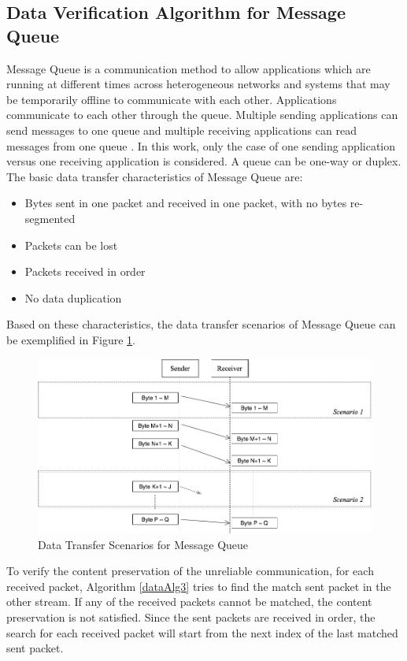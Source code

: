 \subsection{Data Verification Algorithm for Message Queue}
Message Queue is a communication method to allow applications which are running at different times across heterogeneous networks and systems that may be temporarily offline to communicate with each other. Applications communicate to each other through the queue. Multiple sending applications can send messages to one queue and multiple receiving applications can read messages from one queue \cite{redkar2004pro}. In this work, only the case of one sending application versus one receiving application is considered. A queue can be one-way or duplex. The basic data transfer characteristics of Message Queue are:
\begin{itemize}
  \item Bytes sent in one packet and received in one packet, with no bytes re-segmented
  \item Packets can be lost
  \item Packets received in order
  \item No data duplication
\end{itemize}
Based on these characteristics, the data transfer scenarios of Message Queue can be exemplified in Figure \ref{msmq}.
\begin{figure}[H]
\centerline{\includegraphics[scale=0.4]{Figures/msmq}}
\caption{Data Transfer Scenarios for Message Queue}
\label{msmq}
\end{figure}

To verify the content preservation of the unreliable communication, for each received packet, Algorithm \ref{dataAlg3} tries to find the match sent packet in the other stream. If any of the received packets cannot be matched, the content preservation is not satisfied. Since the sent packets are received in order, the search for each received packet will start from the next index of the last matched sent packet. 


